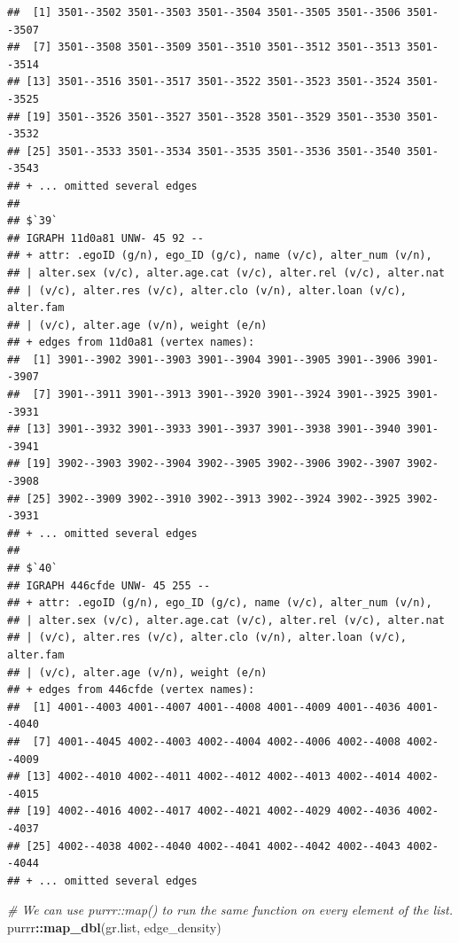 \documentclass[
]{book}
\newenvironment{Shaded}{\begin{snugshade}}{\end{snugshade}}
\newcommand{\CommentTok}[1]{\textcolor[rgb]{0.56,0.35,0.01}{\textit{#1}}}
\newcommand{\FunctionTok}[1]{\textcolor[rgb]{0.13,0.29,0.53}{\textbf{#1}}}
\newcommand{\NormalTok}[1]{#1}
\newcommand{\SpecialCharTok}[1]{\textcolor[rgb]{0.81,0.36,0.00}{\textbf{#1}}}
\begin{document}
\begin{verbatim}
##  [1] 3501--3502 3501--3503 3501--3504 3501--3505 3501--3506 3501--3507
##  [7] 3501--3508 3501--3509 3501--3510 3501--3512 3501--3513 3501--3514
## [13] 3501--3516 3501--3517 3501--3522 3501--3523 3501--3524 3501--3525
## [19] 3501--3526 3501--3527 3501--3528 3501--3529 3501--3530 3501--3532
## [25] 3501--3533 3501--3534 3501--3535 3501--3536 3501--3540 3501--3543
## + ... omitted several edges
## 
## $`39`
## IGRAPH 11d0a81 UNW- 45 92 -- 
## + attr: .egoID (g/n), ego_ID (g/c), name (v/c), alter_num (v/n),
## | alter.sex (v/c), alter.age.cat (v/c), alter.rel (v/c), alter.nat
## | (v/c), alter.res (v/c), alter.clo (v/n), alter.loan (v/c), alter.fam
## | (v/c), alter.age (v/n), weight (e/n)
## + edges from 11d0a81 (vertex names):
##  [1] 3901--3902 3901--3903 3901--3904 3901--3905 3901--3906 3901--3907
##  [7] 3901--3911 3901--3913 3901--3920 3901--3924 3901--3925 3901--3931
## [13] 3901--3932 3901--3933 3901--3937 3901--3938 3901--3940 3901--3941
## [19] 3902--3903 3902--3904 3902--3905 3902--3906 3902--3907 3902--3908
## [25] 3902--3909 3902--3910 3902--3913 3902--3924 3902--3925 3902--3931
## + ... omitted several edges
## 
## $`40`
## IGRAPH 446cfde UNW- 45 255 -- 
## + attr: .egoID (g/n), ego_ID (g/c), name (v/c), alter_num (v/n),
## | alter.sex (v/c), alter.age.cat (v/c), alter.rel (v/c), alter.nat
## | (v/c), alter.res (v/c), alter.clo (v/n), alter.loan (v/c), alter.fam
## | (v/c), alter.age (v/n), weight (e/n)
## + edges from 446cfde (vertex names):
##  [1] 4001--4003 4001--4007 4001--4008 4001--4009 4001--4036 4001--4040
##  [7] 4001--4045 4002--4003 4002--4004 4002--4006 4002--4008 4002--4009
## [13] 4002--4010 4002--4011 4002--4012 4002--4013 4002--4014 4002--4015
## [19] 4002--4016 4002--4017 4002--4021 4002--4029 4002--4036 4002--4037
## [25] 4002--4038 4002--4040 4002--4041 4002--4042 4002--4043 4002--4044
## + ... omitted several edges
\end{verbatim}

\begin{Shaded}
\begin{Highlighting}[]
\CommentTok{\# We can use purrr::map() to run the same function on every element of the list.}
\NormalTok{purrr}\SpecialCharTok{::}\FunctionTok{map\_dbl}\NormalTok{(gr.list, edge\_density)}
\end{Highlighting}
\end{Shaded}
\end{document}
